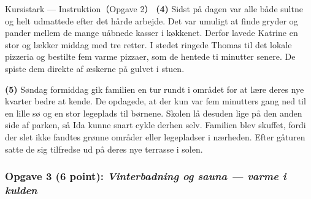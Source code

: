 \begin{emailbox}{Kursistark --- Instruktion（Opgave 2）}
\vspace{0.35em}
\textbf{(4)} Sidst på dagen var alle både sultne og helt udmattede efter det hårde arbejde. Det var umuligt at finde gryder og pander mellem de mange uåbnede kasser i køkkenet. Derfor lavede Katrine en stor og lækker middag med tre retter. I stedet ringede Thomas til det lokale pizzeria og bestilte fem varme pizzaer, som de hentede ti minutter senere. De spiste dem direkte af æskerne på gulvet i stuen.

\vspace{0.35em}
\textbf{(5)} Søndag formiddag gik familien en tur rundt i området for at lære deres nye kvarter bedre at kende. De opdagede, at der kun var fem minutters gang ned til en lille sø og en stor legeplads til børnene. Skolen lå desuden lige på den anden side af parken, så Ida kunne snart cykle derhen selv. Familien blev skuffet, fordi der slet ikke fandtes grønne områder eller legepladser i nærheden. Efter gåturen satte de sig tilfredse ud på deres nye terrasse i solen.
\end{emailbox}

\subsubsection*{Opgave 3 (6 point): \textit{Vinterbadning og sauna --- varme i kulden}}

